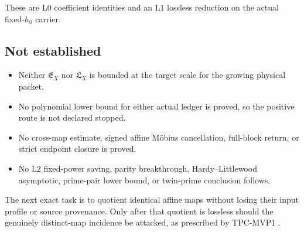 \documentclass[11pt]{article}
\theoremstyle{definition}
\theoremstyle{remark}
\newcommand{\Lzero}{\mathrm{L0}}
\newcommand{\Lone}{\mathrm{L1}}
\newcommand{\Ltwo}{\mathrm{L2}}
\newcommand{\EX}{\mathfrak E_X}
\newcommand{\LX}{\mathfrak L_X}
\begin{document}
These are \(\Lzero\) coefficient identities and an \(\Lone\)
lossless reduction on the actual fixed-\(h_0\) carrier.

\subsection*{Not established}

\begin{itemize}[leftmargin=2em]
\item Neither \(\EX\) nor \(\LX\) is bounded at the target scale
for the growing physical packet.
\item No polynomial lower bound for either actual ledger is proved,
so the positive route is not declared stopped.
\item No cross-map estimate, signed affine M\"obius cancellation,
full-block return, or strict endpoint closure is proved.
\item No \(\Ltwo\) fixed-power saving, parity breakthrough,
Hardy--Littlewood asymptotic, prime-pair lower bound, or twin-prime
conclusion follows.
\end{itemize}

The next exact task is to quotient identical affine maps without
losing their input profile or source provenance.  Only after that
quotient is lossless should the genuinely distinct-map incidence
be attacked, as prescribed by TPC-MVP1
\citep{WangTPCMVP1}.

\begingroup
\footnotesize
\raggedright


\endgroup
\end{document}
